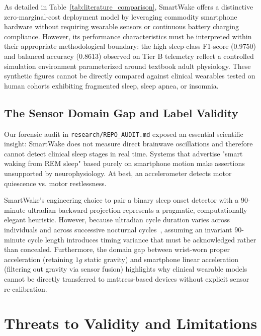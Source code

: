 \documentclass[journal,11pt,onecolumn]{IEEEtran}
\begin{document}
As detailed in Table~\ref{tab:literature_comparison}, SmartWake offers a distinctive zero-marginal-cost deployment model by leveraging commodity smartphone hardware without requiring wearable sensors or continuous battery charging compliance. However, its performance characteristics must be interpreted within their appropriate methodological boundary: the high sleep-class F1-score (0.9750) and balanced accuracy (0.8613) observed on Tier B telemetry reflect a controlled simulation environment parameterized around textbook adult physiology. These synthetic figures cannot be directly compared against clinical wearables tested on human cohorts exhibiting fragmented sleep, sleep apnea, or insomnia.

\subsection{The Sensor Domain Gap and Label Validity}
Our forensic audit in \texttt{research/REPO\_AUDIT.md} exposed an essential scientific insight: SmartWake does not measure direct brainwave oscillations and therefore cannot detect clinical sleep stages in real time. Systems that advertise "smart waking from REM sleep" based purely on smartphone motion make assertions unsupported by neurophysiology. At best, an accelerometer detects motor quiescence vs. motor restlessness. 

SmartWake's engineering choice to pair a binary sleep onset detector with a 90-minute ultradian backward projection represents a pragmatic, computationally elegant heuristic. However, because ultradian cycle duration varies across individuals and across successive nocturnal cycles~\cite{carskadon2011normal}, assuming an invariant 90-minute cycle length introduces timing variance that must be acknowledged rather than concealed. Furthermore, the domain gap between wrist-worn proper acceleration (retaining $1g$ static gravity) and smartphone linear acceleration (filtering out gravity via sensor fusion) highlights why clinical wearable models cannot be directly transferred to mattress-based devices without explicit sensor re-calibration.

\section{Threats to Validity and Limitations}
\label{sec:threats_to_validity}
\end{document}
